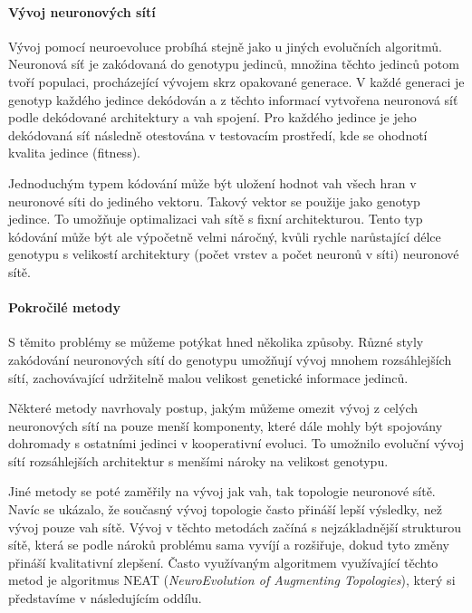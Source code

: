\paragraph{Vývoj neuronových sítí}
Vývoj pomocí neuroevoluce probíhá stejně jako u jiných evolučních algoritmů.
Neuronová síť je zakódovaná do genotypu jedinců, množina těchto jedinců potom
tvoří populaci, procházející vývojem skrz opakované generace. V každé generaci
je genotyp každého jedince dekódován a z těchto informací vytvořena neuronová
síť podle dekódované architektury a vah spojení. Pro každého jedince je jeho
dekódovaná síť následně otestována v testovacím prostředí, kde se ohodnotí
kvalita jedince (fitness).

Jednoduchým typem kódování může být uložení hodnot vah všech hran v neuronové
síti do jediného vektoru. Takový vektor se použije jako genotyp jedince. To
umožňuje optimalizaci vah sítě s fixní architekturou. Tento typ kódování může
být ale výpočetně velmi náročný, kvůli rychle narůstající délce genotypu s
velikostí architektury (počet vrstev a počet neuronů v síti) neuronové sítě.

\paragraph{Pokročilé metody}
S těmito problémy se můžeme potýkat hned několika způsoby. Různé styly
zakódování neuronových sítí do genotypu umožňují vývoj mnohem
rozsáhlejších sítí, zachovávající udržitelně malou velikost genetické
informace jedinců. 

Některé metody \citet{gomez2008accelerated} navrhovaly postup, jakým můžeme
omezit vývoj z celých neuronových sítí na pouze menší komponenty, které dále
mohly být spojovány dohromady s ostatními jedinci v kooperativní evoluci. To
umožnilo evoluční vývoj sítí rozsáhlejších architektur s menšími nároky na
velikost genotypu.

Jiné metody se poté zaměřily na vývoj jak vah, tak topologie neuronové sítě.
Navíc se ukázalo, že současný vývoj topologie často přináší lepší výsledky, než
vývoj pouze vah sítě. Vývoj v těchto metodách začíná s nejzákladnější
strukturou sítě, která se podle nároků problému sama vyvíjí a rozšiřuje, dokud
tyto změny přináší kvalitativní zlepšení. Často využívaným algoritmem
využívající těchto metod je algoritmus NEAT (\emph{NeuroEvolution of Augmenting
Topologies}), který si představíme v následujícím oddílu.

